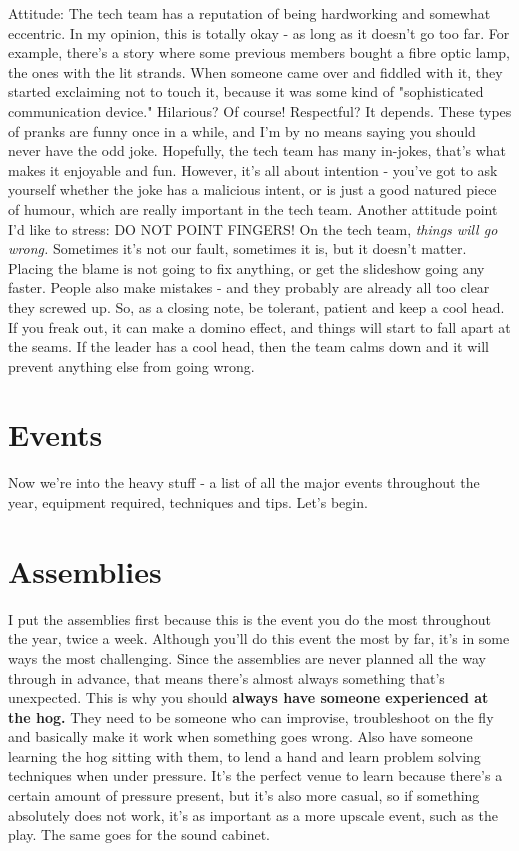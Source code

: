 \documentclass[11pt,a4paper]{book}
\begin{document}
Attitude: The tech team has a reputation of being hardworking and somewhat eccentric. In my opinion, this is totally okay - as long as it doesn't go too far. For example, there's a story where some previous members bought a fibre optic lamp, the ones with the lit strands. When someone came over and fiddled with it, they started exclaiming not to touch it, because it was some kind of "sophisticated communication device." Hilarious? Of course! Respectful? It depends. These types of pranks are funny once in a while, and I'm by no means saying you should never have the odd joke. Hopefully, the tech team has many in-jokes, that's what makes it enjoyable and fun. However, it's all about intention - you've got to ask yourself whether the joke has a malicious intent, or is just a good natured piece of humour, which are really important in the tech team. Another attitude point I'd like to stress: DO NOT POINT FINGERS! On the tech team, \textit{things will go wrong.} Sometimes it's not our fault, sometimes it is, but it doesn't matter. Placing the blame is not going to fix anything, or get the slideshow going any faster. People also make mistakes - and they probably are already all too clear they screwed up. So, as a closing note, be tolerant, patient and keep a cool head. If you freak out, it can make a domino effect, and things will start to fall apart at the seams. If the leader has a cool head, then the team calms down and it will prevent anything else from going wrong.
\chapter{Events}
Now we're into the heavy stuff - a list of all the major events throughout the year, equipment required, techniques and tips. Let's begin.
\chapter{Assemblies}
I put the assemblies first because this is the event you do the most throughout the year, twice a week. Although you'll do this event the most by far, it's in some ways the most challenging. Since the assemblies are never planned all the way through in advance, that means there's almost always something that's unexpected. This is why you should \textbf{always have someone experienced at the hog.} They need to be someone who can improvise, troubleshoot on the fly and basically make it work when something goes wrong. Also have someone learning the hog sitting with them, to lend a hand and learn problem solving techniques when under pressure. It's the perfect venue to learn because there's a certain amount of pressure present, but it's also more casual, so if something absolutely does not work, it's as important as a more upscale event, such as the play. The same goes for the sound cabinet. 
\end{document}
